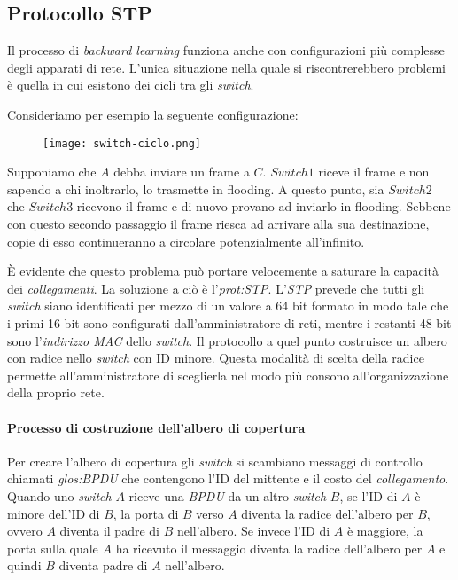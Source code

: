 \subsection{Protocollo STP}
Il processo di \emph{backward learning} funziona anche con configurazioni più
complesse degli apparati di rete. L'unica situazione nella quale si
riscontrerebbero problemi è quella in cui esistono dei cicli tra gli \emph{switch}.

\begin{eg}
    Consideriamo per esempio la seguente configurazione:

    \begin{figure}[h!]
        \centering
        \texttt{[image: switch-ciclo.png]}
    \end{figure}\noindent
    Supponiamo che $A$ debba inviare un frame a $C$. $Switch 1$ riceve il frame
    e non sapendo a chi inoltrarlo, lo trasmette in flooding. A questo punto,
    sia $Switch 2$ che $Switch 3$ ricevono il frame e di nuovo provano ad
    inviarlo in flooding. Sebbene con questo secondo passaggio il frame riesca
    ad arrivare alla sua destinazione, copie di esso continueranno a circolare
    potenzialmente all'infinito.
\end{eg}\noindent
È evidente che questo problema può portare velocemente a saturare la capacità
dei \emph{collegamenti}. La soluzione a ciò è l'\emph{\gls{prot:STP}}. L'\emph{STP}
prevede che tutti gli \emph{switch} siano identificati per mezzo di un valore a
64 bit formato in modo tale che i primi 16 bit sono configurati
dall'amministratore di reti, mentre i restanti 48 bit sono l'\emph{indirizzo MAC}
dello \emph{switch}. Il protocollo a quel punto costruisce un albero con radice
nello \emph{switch} con ID minore. Questa modalità di scelta della radice
permette all'amministratore di sceglierla nel modo più consono all'organizzazione
della proprio rete.

\paragraph{Processo di costruzione dell'albero di copertura}
Per creare l'albero di copertura gli \emph{switch} si scambiano messaggi di
controllo chiamati \emph{\gls{glos:BPDU}} che contengono l'ID del mittente e il
costo del \emph{collegamento}. Quando uno \emph{switch} $A$ riceve una \emph{BPDU}
da un altro \emph{switch} $B$, se l'ID di $A$ è minore dell'ID di $B$, la porta
di $B$ verso $A$ diventa la radice dell'albero per $B$, ovvero $A$ diventa il
padre di $B$ nell'albero. Se invece l'ID di $A$ è maggiore, la porta sulla quale
$A$ ha ricevuto il messaggio diventa la radice dell'albero per $A$ e quindi $B$
diventa padre di $A$ nell'albero.

